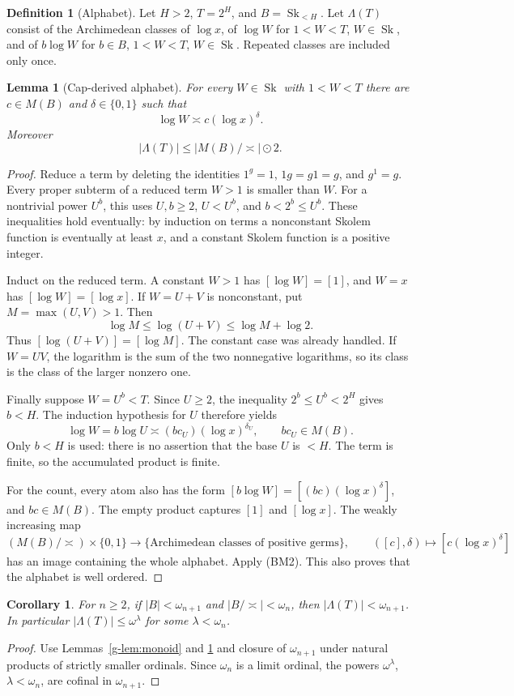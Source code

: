 \documentclass[11pt]{article}
\newtheorem{lemma}[theorem]{Lemma}
\newtheorem{corollary}[theorem]{Corollary}
\theoremstyle{definition}
\newtheorem{definition}[theorem]{Definition}
\theoremstyle{remark}
\newcommand{\Sk}{\operatorname{Sk}}
\newcommand{\arch}{\mathrel{\asymp}}
\newcommand{\od}{\mathbin{\odot}}
\newcommand{\Lam}{\Lambda}
\numberwithin{equation}{section}
\begin{document}
\begin{definition}[Alphabet]
Let $H>2$, $T=2^H$, and $B=\Sk_{<H}$.
Let $\Lam(T)$ consist of the Archimedean classes of $\log x$,
of $\log W$ for $1<W<T$, $W\in\Sk$, and of
$b\log W$ for $b\in B$, $1<W<T$, $W\in\Sk$.
Repeated classes are included only once.
\end{definition}

\begin{lemma}[Cap-derived alphabet]\label{g-lem:alphabet}
For every $W\in\Sk$ with $1<W<T$ there are $c\in M(B)$ and
$\delta\in\{0,1\}$ such that
\[
 \log W\arch c(\log x)^\delta.
\]
Moreover
\[
 \boxed{\quad |\Lam(T)|\le |M(B)/\arch|\od2.\quad}
\]
\end{lemma}
\begin{proof}
Reduce a term by deleting the identities $1^g=1$, $1g=g1=g$,
and $g^1=g$.  Every proper subterm of a reduced term $W>1$
is smaller than $W$.  For a nontrivial power $U^b$, this uses
$U,b\ge2$, $U<U^b$, and $b<2^b\le U^b$.
These inequalities hold eventually: by induction on terms a
nonconstant Skolem function is eventually at least $x$, and a constant
Skolem function is a positive integer.

Induct on the reduced term.  A constant $W>1$ has
$[\log W]=[1]$, and $W=x$ has $[\log W]=[\log x]$.
If $W=U+V$ is nonconstant, put $M=\max(U,V)>1$.  Then
\[
 \log M\le\log(U+V)\le\log M+\log2.
\]
Thus $[\log(U+V)]=[\log M]$.  The constant case was already handled.
If $W=UV$, the logarithm is the sum of the two nonnegative
logarithms, so its class is the class of the larger nonzero one.

Finally suppose $W=U^b<T$.  Since $U\ge2$, the inequality
$2^b\le U^b<2^H$ gives $b<H$.  The induction hypothesis for $U$
therefore yields
\[
 \log W=b\log U\arch (bc_U)(\log x)^{\delta_U},
 \qquad bc_U\in M(B).
\]
Only $b<H$ is used: there is no assertion that the base $U$ is $<H$.
The term is finite, so the accumulated product is finite.

For the count, every atom also has the form
$[b\log W]=[(bc)(\log x)^\delta]$, and $bc\in M(B)$.
The empty product captures $[1]$ and $[\log x]$.
The weakly increasing map
\[
 (M(B)/\arch)\times\{0,1\}\longrightarrow
 \{\text{Archimedean classes of positive germs}\},\qquad
 ([c],\delta)\longmapsto[c(\log x)^\delta]
\]
has an image containing the whole alphabet.  Apply (BM2).
This also proves that the alphabet is well ordered.
\end{proof}

\begin{corollary}\label{g-cor:alphabet}
For $n\ge2$, if $|B|<\omega_{n+1}$ and $|B/\arch|<\omega_n$,
then $|\Lam(T)|<\omega_{n+1}$.  In particular
$|\Lam(T)|\le\omega^\lambda$ for some $\lambda<\omega_n$.
\end{corollary}
\begin{proof}
Use Lemmas~\ref{g-lem:monoid} and \ref{g-lem:alphabet} and closure of
$\omega_{n+1}$ under natural products of strictly smaller ordinals.
Since $\omega_n$ is a limit ordinal, the powers $\omega^\lambda$,
$\lambda<\omega_n$, are cofinal in $\omega_{n+1}$.
\end{proof}
\end{document}
